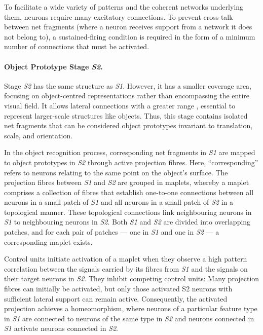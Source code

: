 To facilitate a wide variety of patterns and the coherent networks underlying them, neurons require many excitatory connections. To prevent cross-talk between net fragments (where a neuron receives support from a network it does not belong to), a sustained-firing condition is required in the form of a minimum number of connections that must be activated.

\paragraph{Object Prototype Stage \emph{S2}.} Stage \emph{S2} has the same structure as \emph{S1}. However, it has a smaller coverage area, focusing on object-centred representations rather than encompassing the entire visual field. It allows lateral connections with a greater range , essential to represent larger-scale structures like objects. 
Thus, this stage contains isolated net fragments that can be considered object prototypes invariant to translation, scale, and orientation.

In the object recognition process, corresponding net fragments in \emph{S1} are mapped to object prototypes in \emph{S2} through active projection fibres. Here, ``corresponding'' refers to neurons relating to the same point on the object's surface.
The projection fibres between \emph{S1} and \emph{S2} are grouped in maplets, whereby a maplet comprises a collection of fibres that establish one-to-one connections between all neurons in a small patch of \emph{S1} and all neurons in a small patch of \emph{S2} in a topological manner. These topological connections link neighbouring neurons in \emph{S1} to neighbouring neurons in \emph{S2}. Both \emph{S1} and \emph{S2} are divided into overlapping patches, and for each pair of patches — one in \emph{S1} and one in \emph{S2} — a corresponding maplet exists.

Control units initiate activation of a maplet when they observe a high pattern correlation between the signals carried by its fibres from \emph{S1} and the signals on their target neurons in \emph{S2}. They inhibit competing control units: Many projection fibres can initially be activated, but only those activated S2 neurons with sufficient lateral support can remain active.
Consequently, the activated projection achieves a homeomorphism, where neurons of a particular feature type in \emph{S1} are connected to neurons of the same type in \emph{S2} and neurons connected in \emph{S1} activate neurons connected in \emph{S2}.


